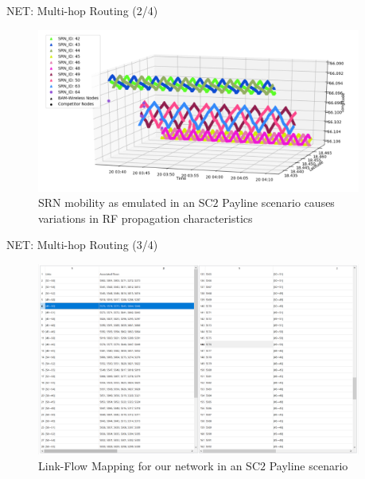 \documentclass{beamer}
\begin{document}
\begin{frame}{NET: Multi-hop Routing (2/4)}
\begin{figure}
    \centering
    \includegraphics[width = 0.95\textwidth]{Payline_Node_GPS_Locations.PNG}
    \caption{SRN mobility as emulated in an SC$2$ Payline scenario causes variations in RF propagation characteristics}
    \label{fig:17}
\end{figure}
\end{frame}
\begin{frame}{NET: Multi-hop Routing (3/4)}
\begin{figure}
    \centering
    \includegraphics[width = 0.95\textwidth]{Link_Flow_Mapping.PNG}
    \caption{Link-Flow Mapping for our network in an SC$2$ Payline scenario}
    \label{fig:18}
\end{figure}
\end{frame}
\end{document}

